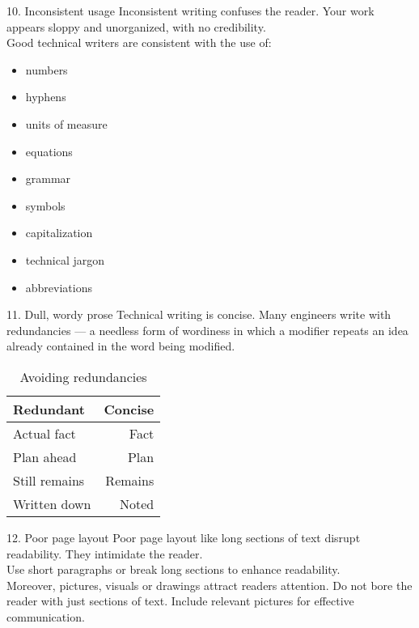 \documentclass[10pt]{beamer}
\begin{document}
{
	\begin{frame}{10. Inconsistent usage}
		Inconsistent writing confuses the reader. Your work appears sloppy and unorganized, with no credibility. \\
		
		Good technical writers are consistent with the use of:
		\begin{multicols}{2}
		\begin{itemize}
			\item numbers
			\item hyphens
			\item units of measure
			\item equations
			\item grammar
			\item symbols
			\item capitalization 
			\item technical jargon
			\item abbreviations 
		\end{itemize}	
		\end{multicols}
	\end{frame}
}
{
	\begin{frame}{11. Dull, wordy prose}
		Technical writing is concise. Many engineers write with redundancies --- a needless form of wordiness in which a modifier repeats an idea already contained in the word being modified. 
		\begin{table}
			\caption{Avoiding redundancies}
			\begin{tabular}{lr}
				\toprule
				Redundant & Concise\\
				\midrule
				Actual fact & Fact\\
				Plan ahead & Plan\\
				Still remains & Remains\\
				Written down & Noted\\
				\bottomrule
			\end{tabular}
		\end{table}	
	\end{frame}
}
{
	\begin{frame}{12. Poor page layout}
		Poor page layout like long sections of text disrupt readability. They intimidate the reader. \\
		Use short paragraphs or break long sections to enhance readability. \\
		Moreover, pictures, visuals or drawings attract readers attention. Do not bore the reader with just sections of text. Include relevant pictures for effective communication.
	\end{frame}
}
\end{document}
